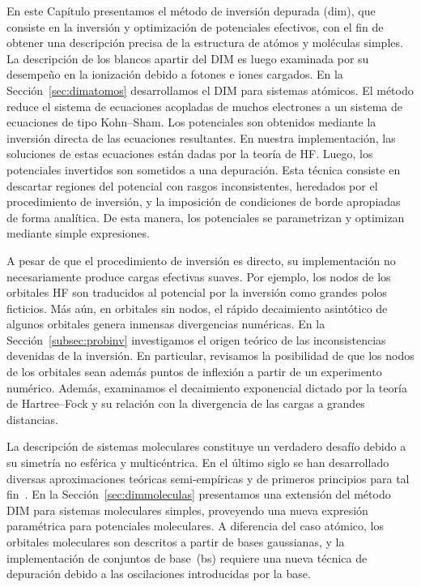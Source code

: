 En este Capítulo presentamos el método de inversión depurada (\acs{dim}),
que consiste en la inversión y optimización de potenciales efectivos, 
con el fin de obtener una descripción precisa de la estructura de atómos 
y moléculas simples. La descripción de los blancos apartir del DIM es 
luego examinada por su desempeño en la ionización debido a fotones e 
iones cargados. En la Sección~\ref{sec:dimatomos} desarrollamos el DIM 
para sistemas atómicos. El método reduce el sistema de ecuaciones 
acopladas de muchos electrones a un sistema de ecuaciones de tipo 
Kohn--Sham. Los potenciales son obtenidos mediante la inversión directa 
de las ecuaciones resultantes. En nuestra implementación, las soluciones 
de estas ecuaciones están dadas por la teoría de HF. Luego, los 
potenciales invertidos son sometidos a una depuración. Esta técnica 
consiste en descartar regiones del potencial con rasgos inconsistentes, 
heredados por el procedimiento de inversión, y la imposición de 
condiciones de borde apropiadas de forma analítica. De esta manera, los 
potenciales se parametrizan y optimizan mediante simple expresiones. 

A pesar de que el procedimiento de inversión es directo, su 
implementación no necesariamente produce cargas efectivas suaves. Por 
ejemplo, los nodos de los orbitales HF son traducidos al potencial por 
la inversión como grandes polos ficticios. Más aún, en orbitales sin 
nodos, el rápido decaimiento asintótico de algunos orbitales genera 
inmensas divergencias numéricas. En la Sección~\ref{subsec:probinv} 
investigamos el origen teórico de las inconsistencias devenidas de la 
inversión. En particular, revisamos la posibilidad de que los nodos de 
los orbitales sean además puntos de inflexión a partir de un experimento 
numérico. Además, examinamos el decaimiento exponencial dictado por la teoría de Hartree--Fock y su relación con la divergencia de las cargas a grandes distancias.

La descripción de sistemas moleculares constituye un verdadero desafío debido a su simetría no esférica y multicéntrica. En el último siglo se han desarrollado diversas aproximaciones teóricas 
semi-empíricas y de primeros principios para tal fin~\cite{Szabo:96,
Helgaker:00,Schaefer:04}. En la Sección~\ref{sec:dimmoleculas} 
presentamos una extensión del método DIM para sistemas moleculares 
simples, proveyendo una nueva expresión paramétrica para potenciales 
moleculares. A diferencia del caso atómico, los orbitales moleculares 
son descritos a partir de bases gaussianas, y la implementación de 
conjuntos de base~(\acs{bs}) requiere una nueva técnica de depuración 
debido a las oscilaciones introducidas por la base. 

